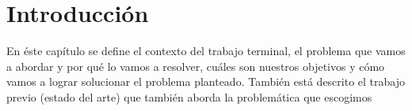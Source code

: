\chapter{Introducci\'on}

En éste capítulo se define el contexto del trabajo terminal, el problema que vamos a abordar y por qué lo vamos a resolver, cuáles son nuestros objetivos y cómo vamos a lograr solucionar el problema planteado. También está descrito el trabajo previo (estado del arte) que también aborda la problemática que escogimos